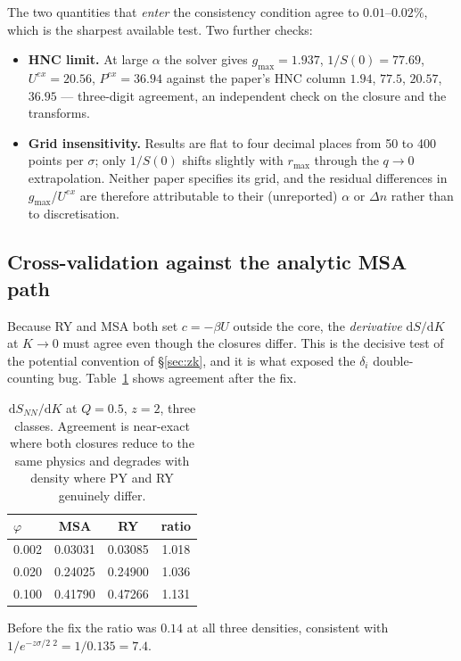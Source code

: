\documentclass[11pt,a4paper]{article}
\begin{document}
The two quantities that \emph{enter} the consistency condition agree to
$0.01$--$0.02\%$, which is the sharpest available test. Two further checks:
\begin{itemize}[nosep]
\item \textbf{HNC limit.} At large $\alpha$ the solver gives
      $g_{\max}=1.937$, $1/S(0)=77.69$, $U^{ex}=20.56$, $P^{ex}=36.94$
      against the paper's HNC column $1.94$, $77.5$, $20.57$, $36.95$ ---
      three-digit agreement, an independent check on the closure and the
      transforms.
\item \textbf{Grid insensitivity.} Results are flat to four decimal places
      from 50 to 400 points per $\sigma$; only $1/S(0)$ shifts slightly with
      $r_{\max}$ through the $q\to0$ extrapolation. Neither paper specifies
      its grid, and the residual differences in $g_{\max}$/$U^{ex}$ are
      therefore attributable to their (unreported) $\alpha$ or $\Delta n$
      rather than to discretisation.
\end{itemize}

\subsection{Cross-validation against the analytic MSA path}

Because RY and MSA both set $c=-\beta U$ outside the core, the
\emph{derivative} $\mathrm{d}S/\mathrm{d}K$ at $K\to0$ must agree even though
the closures differ. This is the decisive test of the potential convention of
\S\ref{sec:zk}, and it is what exposed the $\delta_i$ double-counting bug.
Table~\ref{tab:msary} shows agreement after the fix.

\begin{table}[htbp]
\centering
\caption{$\mathrm{d}S_{NN}/\mathrm{d}K$ at $Q=0.5$, $z=2$, three classes.
Agreement is near-exact where both closures reduce to the same physics and
degrades with density where PY and RY genuinely differ.}
\label{tab:msary}
\begin{tabular}{lccc}
\toprule
$\varphi$ & MSA & RY & ratio\\
\midrule
0.002 & 0.03031 & 0.03085 & 1.018\\
0.020 & 0.24025 & 0.24900 & 1.036\\
0.100 & 0.41790 & 0.47266 & 1.131\\
\bottomrule
\end{tabular}
\end{table}

Before the fix the ratio was $0.14$ at all three densities, consistent with
$1/e^{-z\sigma/2}\,^2=1/0.135=7.4$.
\end{document}
